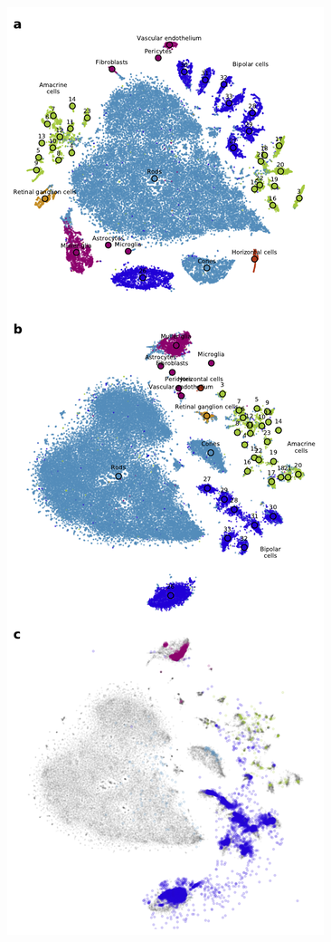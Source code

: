 \documentclass{bioinfo}
\begin{document}




\begin{figure}[htbp]
\centerline{\includegraphics[width=0.7\linewidth]{policar-fig-1}}

\end{figure}
\end{document}
